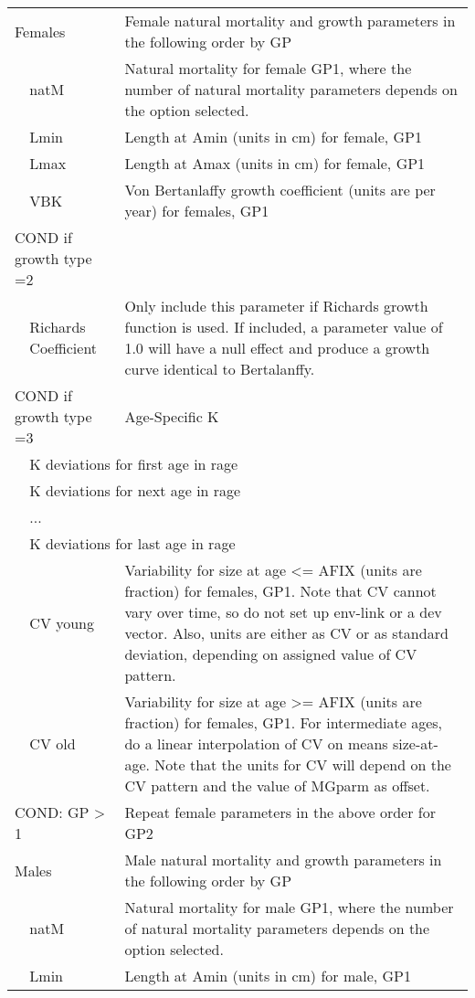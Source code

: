 \begin{center}
\begin{longtable}{p{1cm} p{2.5cm} p{10cm}}
		\multicolumn{2}{l}{Females} & Female natural mortality and growth parameters in the following order by GP\\
		& natM & Natural mortality for female GP1, where the number of natural mortality parameters depends on the option selected.\\
		& Lmin & Length at Amin (units in cm) for female, GP1 \\
		& Lmax & Length at Amax (units in cm) for female, GP1 \\
		& VBK & Von Bertanlaffy growth coefficient (units are per year) for females, GP1\\
		\hline
		\multicolumn{2}{l}{COND if growth type =2 } & \\
		& Richards Coefficient & Only include this parameter if Richards growth function is used.  If included, a parameter value of 1.0 will have a null effect and produce a growth curve identical to Bertalanffy.\\
		\multicolumn{2}{l}{COND if growth type =3 } & Age-Specific K \\
		& \multicolumn{2}{l}{K deviations for first age in rage}\\
		& \multicolumn{2}{l}{K deviations for next age in rage}\\
		& ... & \\
		& \multicolumn{2}{l}{K deviations for last age in rage}\\
		\hline
	    & CV young & Variability for size at age <= AFIX (units are fraction) for females, GP1.  Note that CV cannot vary over time, so do not set up env-link or a dev vector.  Also, units are either as CV or as standard deviation, depending on assigned value of CV pattern.\\
		& CV old & Variability for size at age >= AFIX (units are fraction) for females, GP1. For intermediate ages, do a linear interpolation of CV on means size-at-age.  Note that the units for CV will depend on the CV pattern and the value of MGparm as offset.\\
		\hline
		\multicolumn{2}{l}{COND: GP > 1} & Repeat female parameters in the above order for GP2\\
		\hline
		\multicolumn{2}{l}{Males} & Male natural mortality and growth parameters in the following order by GP\\
		& natM & Natural mortality for male GP1, where the number of natural mortality parameters depends on the option selected.\\
		& Lmin & Length at Amin (units in cm) for male, GP1\\

\end{longtable}
\end{center}
